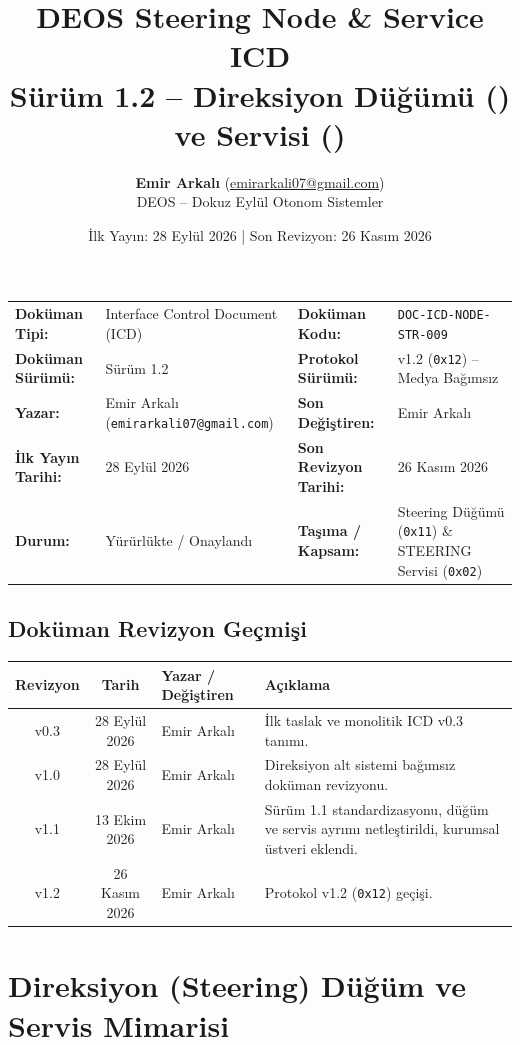 \documentclass[a4paper,10pt]{article}
\title{\textbf{DEOS Steering Node \& Service ICD}\\
\large Sürüm 1.2 -- Direksiyon Düğümü (\hex{11}) ve Servisi (\hex{02})}
\author{\textbf{Emir Arkalı} (\href{mailto:emirarkali07@gmail.com}{emirarkali07@gmail.com})\\DEOS -- Dokuz Eylül Otonom Sistemler}
\date{İlk Yayın: 28 Eylül 2026 \quad | \quad Son Revizyon: 26 Kasım 2026}
\newcommand{\hex}[1]{\texttt{0x#1}}
\newcommand{\code}[1]{\texttt{#1}}
\begin{document}
\maketitle

\begin{center}
\small
\begin{tabularx}{\textwidth}{ll lX}
\toprule
\textbf{Doküman Tipi:} & Interface Control Document (ICD) & \textbf{Doküman Kodu:} & \code{DOC-ICD-NODE-STR-009} \\
\textbf{Doküman Sürümü:} & Sürüm 1.2 & \textbf{Protokol Sürümü:} & v1.2 (\hex{12}) -- Medya Bağımsız \\
\textbf{Yazar:} & Emir Arkalı (\texttt{emirarkali07@gmail.com}) & \textbf{Son Değiştiren:} & Emir Arkalı \\
\textbf{İlk Yayın Tarihi:} & 28 Eylül 2026 & \textbf{Son Revizyon Tarihi:} & 26 Kasım 2026 \\
\textbf{Durum:} & Yürürlükte / Onaylandı & \textbf{Taşıma / Kapsam:} & Steering Düğümü (\hex{11}) \& STEERING Servisi (\hex{02}) \\
\bottomrule
\end{tabularx}
\end{center}

\subsection*{Doküman Revizyon Geçmişi}
\begin{center}
\small
\begin{tabularx}{\textwidth}{c c l X}
\toprule
\textbf{Revizyon} & \textbf{Tarih} & \textbf{Yazar / Değiştiren} & \textbf{Açıklama} \\
\midrule
v0.3 & 28 Eylül 2026 & Emir Arkalı & İlk taslak ve monolitik ICD v0.3 tanımı. \\
v1.0 & 28 Eylül 2026 & Emir Arkalı & Direksiyon alt sistemi bağımsız doküman revizyonu. \\
v1.1 & 13 Ekim 2026 & Emir Arkalı & Sürüm 1.1 standardizasyonu, düğüm ve servis ayrımı netleştirildi, kurumsal üstveri eklendi. \\
v1.2 & 26 Kasım 2026 & Emir Arkalı & Protokol v1.2 (\hex{12}) geçişi. \\
\bottomrule
\end{tabularx}
\end{center}
\vspace{0.8em}

\section{Direksiyon (Steering) Düğüm ve Servis Mimarisi}
\end{document}
